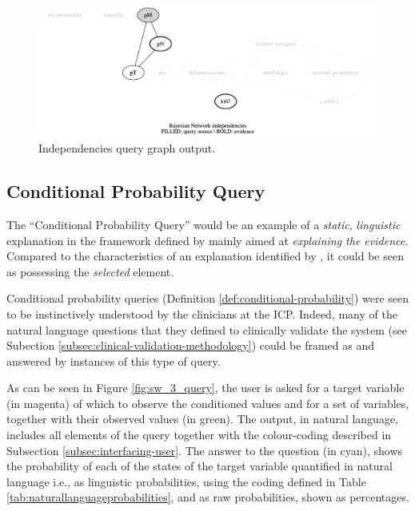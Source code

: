 \begin{figure}[htbp]
\centerline{\includegraphics[width=\textwidth]{results/images/independencies_output}}
\caption{Independencies query graph output.}
\label{fig:independencies_output}
\end{figure}

\subsection{Conditional Probability Query} \label{subsec:results-conditional-probability-query}
The \enquote{Conditional Probability Query} would be an example of a \textit{static}, \textit{linguistic} explanation in the framework defined by \citet{lacave2002review} mainly aimed at \textit{explaining the evidence}.
Compared to the characteristics of an explanation identified by \citet{miller2018explanation}, it could be seen as possessing the \textit{selected} element.

Conditional probability queries (Definition \ref{def:conditional-probability}) were seen to be instinctively understood by the clinicians at the ICP.
Indeed, many of the natural language questions that they defined to clinically validate the system (see Subection \ref{subsec:clinical-validation-methodology}) could be framed as and answered by instances of this type of query.

As can be seen in Figure \ref{fig:sw_3_query}, the user is asked for a target variable (in magenta) of which to observe the conditioned values and for a set of variables, together with their observed values (in green).
The output, in natural language, includes all elements of the query together with the colour-coding described in Subsection \ref{subsec:interfacing-user}.
The answer to the question (in cyan), shows the probability of each of the states of the target variable quantified in natural language i.e., as linguistic probabilities, using the coding defined in Table \ref{tab:naturallanguageprobabilities}, and as raw probabilities, shown as percentages.

